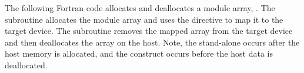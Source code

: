 
The following Fortran code allocates and deallocates a module array, .  The
 subroutine allocates the module array and uses the
 directive to map it to the target device. The
 subroutine removes the mapped array from the target device and
then deallocates the array on the host.  Note, the stand-alone 
 occurs after the host memory is allocated, and the
 construct occurs before the host data is deallocated.


